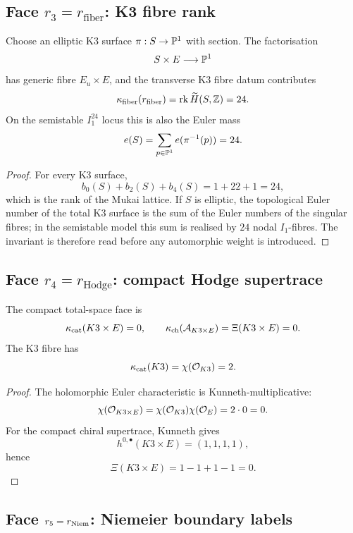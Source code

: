 \subsection{Face $r_3=r_{\mathrm{fiber}}$: K3 fibre rank}
\label{wn:subsec:r3-fiber}

\begin{proposition}
\label{wn:prop:r3-fiber-witness}
Choose an elliptic K3 surface \(\pi:S\to\mathbb{P}^1\) with section.  The
factorisation
\[
  S\times E\longrightarrow\mathbb{P}^1
\]
has generic fibre \(E_u\times E\), and the transverse K3 fibre datum
contributes
\[
  \kappa_{\mathrm{fiber}}(r_{\mathrm{fiber}})
  =\mathrm{rk}\,\widetilde H(S,\mathbb{Z})
  =24.
\]
On the semistable \(I_1^{24}\) locus this is also the Euler mass
\[
  e(S)=\sum_{p\in\mathbb{P}^1}e(\pi^{-1}(p))=24.
\]
\end{proposition}

\begin{proof}
For every K3 surface,
\[
  b_0(S)+b_2(S)+b_4(S)=1+22+1=24,
\]
which is the rank of the Mukai lattice.  If \(S\) is elliptic, the
topological Euler number of the total K3 surface is the sum of the Euler
numbers of the singular fibres; in the semistable model this sum is
realised by \(24\) nodal \(I_1\)-fibres.  The invariant is therefore
read before any automorphic weight is introduced.
\end{proof}

\subsection{Face $r_4=r_{\mathrm{Hodge}}$: compact Hodge supertrace}
\label{wn:subsec:r4-Hodge}

\begin{proposition}
\label{wn:prop:r4-Hodge-witness}
The compact total-space face is
\[
  \kappa_{\mathrm{cat}}(K3\times E)=0,\qquad
  \kappa_{\mathrm{ch}}(\mathcal{A}_{K3\times E})=\Xi(K3\times E)=0.
\]
The K3 fibre has
\[
  \kappa_{\mathrm{cat}}(K3)=\chi(\mathcal{O}_{K3})=2.
\]
\end{proposition}

\begin{proof}
The holomorphic Euler characteristic is Kunneth-multiplicative:
\[
  \chi(\mathcal{O}_{K3\times E})=\chi(\mathcal{O}_{K3})\chi(\mathcal{O}_E)=2\cdot0=0.
\]
For the compact chiral supertrace, Kunneth gives
\[
  h^{0,\bullet}(K3\times E)=(1,1,1,1),
\]
hence
\[
  \Xi(K3\times E)=1-1+1-1=0.
\]
\end{proof}

\subsection{Face $r_5=r_{\mathrm{Niem}}$: Niemeier boundary labels}
\label{wn:subsec:r5-Niemeier}

